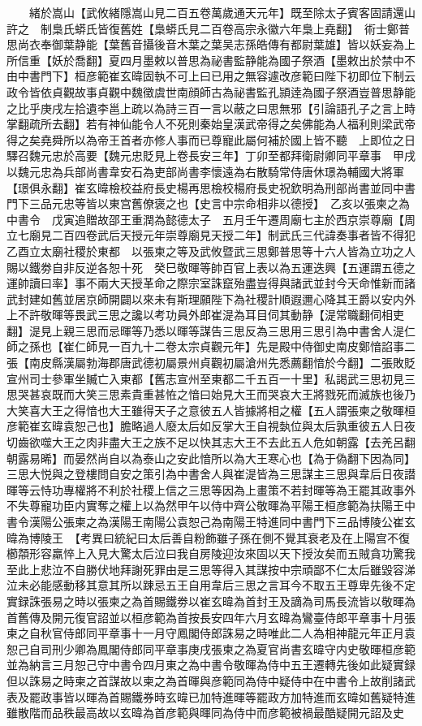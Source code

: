 　　緒於嵩山【武攸緒隱嵩山見二百五卷萬歲通天元年】既至除太子賓客固請還山許之　制梟氏蟒氏皆復舊姓【梟蟒氏見二百卷高宗永徽六年梟上堯翻】　術士鄭普思尚衣奉御葉静能【葉舊音攝後音木葉之葉吴志孫皓傳有都尉葉雄】皆以妖妄為上所信重【妖於喬翻】夏四月墨敕以普思為祕書監静能為國子祭酒【墨敕出於禁中不由中書門下】桓彦範崔玄暐固執不可上曰已用之無容遽改彦範曰陛下初即位下制云政令皆依貞觀故事貞觀中魏徵虞世南顔師古為祕書監孔頴逹為國子祭酒豈普思静能之比乎庚戌左拾遺李邕上疏以為詩三百一言以蔽之曰思無邪【引論語孔子之言上時掌翻疏所去翻】若有神仙能令人不死則秦始皇漢武帝得之矣佛能為人福利則梁武帝得之矣堯舜所以為帝王首者亦修人事而已尊寵此屬何補於國上皆不聽　上即位之日驛召魏元忠於高要【魏元忠貶見上卷長安三年】丁卯至都拜衛尉卿同平章事　甲戌以魏元忠為兵部尚書韋安石為吏部尚書李懷遠為右散騎常侍唐休璟為輔國大將軍【璟俱永翻】崔玄暐檢校益府長史楊再思檢校楊府長史祝欽明為刑部尚書並同中書門下三品元忠等皆以東宫舊僚褒之也【史言中宗命相非以德授】　乙亥以張柬之為中書令　戊寅追贈故邵王重潤為懿德太子　五月壬午遷周廟七主於西京崇尊廟【周立七廟見二百四卷武后天授元年崇尊廟見天授二年】制武氏三代諱奏事者皆不得犯　乙酉立太廟社稷於東都　以張柬之等及武攸暨武三思鄭普思等十六人皆為立功之人賜以鐵劵自非反逆各恕十死　癸巳敬暉等帥百官上表以為五運迭興【五運謂五德之運帥讀曰率】事不兩大天授革命之際宗室誅竄殆盡豈得與諸武並封今天命惟新而諸武封建如舊並居京師開闢以來未有斯理願陛下為社稷計順遐邇心降其王爵以安内外上不許敬暉等畏武三思之讒以考功員外郎崔湜為耳目伺其動静【湜常職翻伺相吏翻】湜見上親三思而忌暉等乃悉以暉等謀告三思反為三思用三思引為中書舍人湜仁師之孫也【崔仁師見一百九十二卷太宗貞觀元年】先是殿中侍御史南皮鄭愔諂事二張【南皮縣漢屬勃海郡唐武德初屬景州貞觀初屬滄州先悉薦翻愔於今翻】二張敗貶宣州司士參軍坐贓亡入東都【舊志宣州至東都二千五百一十里】私謁武三思初見三思哭甚哀既而大笑三思素貴重甚恠之愔曰始見大王而哭哀大王將戮死而滅族也後乃大笑喜大王之得愔也大王雖得天子之意彼五人皆據將相之權【五人謂張柬之敬暉桓彦範崔玄暐袁恕己也】膽略過人廢太后如反掌大王自視埶位與太后孰重彼五人日夜切齒欲噬大王之肉非盡大王之族不足以快其志大王不去此五人危如朝露【去羌呂翻朝露易晞】而晏然尚自以為泰山之安此愔所以為大王寒心也【為于偽翻下因為同】三思大悦與之登樓問自安之策引為中書舍人與崔湜皆為三思謀主三思與韋后日夜譛暉等云恃功專權將不利於社稷上信之三思等因為上畫策不若封暉等為王罷其政事外不失尊寵功臣内實奪之權上以為然甲午以侍中齊公敬暉為平陽王桓彦範為扶陽王中書令漢陽公張柬之為漢陽王南陽公袁恕己為南陽王特進同中書門下三品博陵公崔玄暐為博陵王　【考異曰統紀曰太后善自粉飾雖子孫在側不覺其衰老及在上陽宫不復櫛頮形容羸悴上入見大驚太后泣曰我自房陵迎汝來固以天下授汝矣而五賊貪功驚我至此上悲泣不自勝伏地拜謝死罪由是三思等得入其謀按中宗頑鄙不仁太后雖毀容涕泣未必能感動移其意其所以踈忌五王自用韋后三思之言耳今不取五王尊卑先後不定實録誅張易之時以張柬之為首賜鐵劵以崔玄暐為首封王及謫為司馬長流皆以敬暉為首舊傳及開元復官詔並以桓彦範為首按長安四年六月玄暐為鸞臺侍郎平章事十月張柬之自秋官侍郎同平章事十一月守鳳閣侍郎誅易之時唯此二人為相神龍元年正月袁恕己自司刑少卿為鳳閣侍郎同平章事庚戌張柬之為夏官尚書玄暐守内史敬暉桓彦範並為納言三月恕己守中書令四月東之為中書令敬暉為侍中五王遷轉先後如此疑實録但以誅易之時柬之首謀故以柬之為首暉與彦範同為侍中疑侍中在中書令上故削諸武表及罷政事皆以暉為首賜鐵券時玄暐已加特進暉等罷政方加特進而玄暐如舊疑特進雖散階而品秩最高故以玄暐為首彦範與暉同為侍中而彦範被禍最酷疑開元詔及史